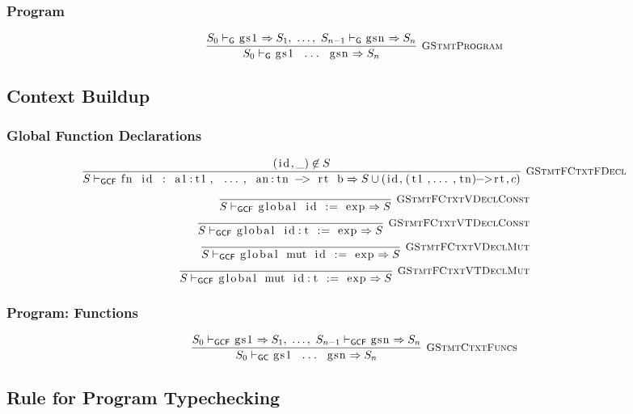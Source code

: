 \documentclass{article}
\newcommand{\code}[1]{\lstinline[columns=fixed]{#1}}
\newcommand{\drmrule}[5]{\frac{#1}{#2\vdash_{\mathsf{#3}}#4}\textsc{\ \small{#5}}}
\newcommand{\ruleapp}[1]{\vdash_{\mathsf{#1}}}
\newcommand{\mc}[1]{\textnormal{\code{#1}}}
\begin{document}
			\subsubsection{Program}
			
				\begin{align*}
					\drmrule{S_0 \ruleapp{G} \mc{gs1} \Rightarrow S_1,\ \dots,\ S_{n-1} \ruleapp{G} \mc{gsn} \Rightarrow S_n}{S_0}{G}{\mc{gs1 ... gsn} \Rightarrow S_n}{GStmtProgram}
				\end{align*}
				
		\subsection{Context Buildup}
		
			\subsubsection{Global Function Declarations}
			
				\begin{align*}
					\drmrule{(\mc{id},\_) \not\in S}{S}{GCF}{\mc{fn id : a1:t1, ..., an:tn -> rt b} \Rightarrow S \cup (\mc{id}, \mc{(t1,...,tn)->rt}, c)}{GStmtFCtxtFDecl}
				\end{align*}
				\begin{align*}
					\drmrule{}{S}{GCF}{\mc{global id := exp} \Rightarrow S}{GStmtFCtxtVDeclConst}\\
					\drmrule{}{S}{GCF}{\mc{global id:t := exp} \Rightarrow S}{GStmtFCtxtVTDeclConst}\\
					\drmrule{}{S}{GCF}{\mc{global mut id := exp} \Rightarrow S}{GStmtFCtxtVDeclMut}\\
					\drmrule{}{S}{GCF}{\mc{global mut id:t := exp} \Rightarrow S}{GStmtFCtxtVTDeclMut}
				\end{align*}
			
			\subsubsection{Program: Functions}
			
				\begin{align*}
					\drmrule{S_0 \ruleapp{GCF} \mc{gs1} \Rightarrow S_1,\ \dots,\ S_{n-1} \ruleapp{GCF} \mc{gsn} \Rightarrow S_n}{S_0}{GC}{\mc{gs1 ... gsn} \Rightarrow S_n}{GStmtCtxtFuncs}
				\end{align*}
			
		\subsection{Rule for Program Typechecking}
		
\end{document}
